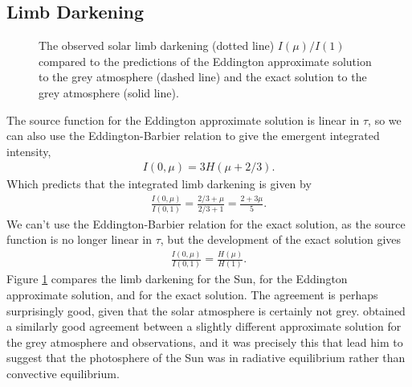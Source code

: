 
\newslide

\subsection{Limb Darkening}

\begin{figure}
\footnotesize
{}
\caption{The observed solar limb darkening (dotted line)
$I(\mu)/I(1)$ compared to the predictions of the Eddington
approximate solution to the grey atmosphere (dashed line)
and the exact solution to the grey atmosphere (solid
line).}
\label{figure-grey-limb-darkening}
\end{figure}

The source function for the Eddington approximate solution
is linear in $\tau$, so we can also use the
Eddington-Barbier relation to give the emergent integrated
intensity,
\begin{align}
I(0,\mu) = 3H(\mu + 2/3).
\end{align}
Which predicts that the integrated limb darkening is given
by
\begin{align}
\frac{I(0,\mu)}{I(0,1)} = \frac{2/3 + \mu}{2/3 + 1} = \frac{2 + 3
\mu}{5}.
\end{align}
We can't use the Eddington-Barbier relation for the exact
solution, as the source function is no longer linear in
$\tau$, but the development of the exact solution gives
\begin{align}
\frac{I(0,\mu)}{I(0,1)} = \frac{H(\mu)}{H(1)}.
\end{align}
Figure
\ref{figure-grey-limb-darkening} compares the limb
darkening for the Sun, for the Eddington approximate solution, and for
the exact solution. The agreement is perhaps surprisingly good, given
that the solar atmosphere is certainly not grey. 
\cite{Schwarzschild-1906} obtained a similarly good agreement between a
slightly different approximate solution for the grey atmosphere and
observations, and it was precisely this that lead him to suggest that
the photosphere of the Sun was in radiative equilibrium rather than
convective equilibrium.

